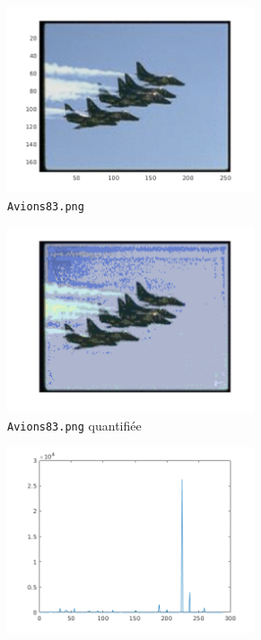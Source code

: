 \documentclass[a4paper]{article}
\begin{document}
\begin{figure}[H]
    \centering
     
    \begin{subfigure}[c]{0.46\textwidth}
        \centering
        \includegraphics[width=0.8\textwidth]{images/Avions83.png}
        \caption{\texttt{Avions83.png}}
    \end{subfigure}
    \begin{subfigure}[c]{0.46\textwidth}
        \centering
        \includegraphics[width=0.8\textwidth]{images/Avions83_quantifie.png}
        \caption{\texttt{Avions83.png} quantifiée}
    \end{subfigure}
    \begin{subfigure}[c]{0.46\textwidth}
        \centering
        \includegraphics[width=0.8\textwidth]{images/Avions83_histo.png}

\end{subfigure}
\end{figure}
\end{document}
